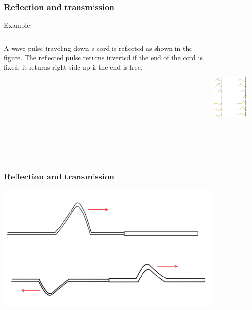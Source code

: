 \documentclass[]{beamer}
\begin{document}
\begin{frame}
\frametitle{Reflection and transmission }

Example:






   \begin{columns}[c]
   \column{2in}  %


A wave pulse traveling down a cord is reflected as shown in the figure. The
reflected pulse returns inverted if the end of the cord is fixed; it
returns right side up if the end is free.

  
   \column{2in}

  \begin{center}
  \includegraphics[height=2.3in]{images4/12.jpg}
\end{center}

   \end{columns}



  \end{frame}




\begin{frame}
\frametitle{Reflection and transmission }

  \begin{center}
  \includegraphics[height=2.5in]{images4/reflection.jpg}
\end{center}



  \end{frame}
\end{document}

